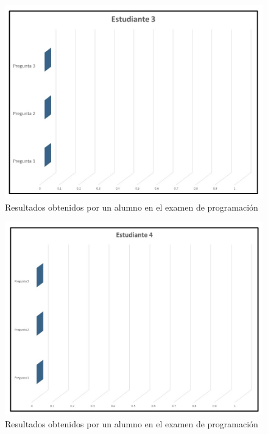 \documentclass[12pt] {report}
\begin{document}
\begin{figure}[H]
\centering 
\includegraphics[scale=.7]{PEstudiante3.JPG}
\caption{Resultados obtenidos por un alumno en el examen de programación}
\end{figure}

\begin{figure}[H]
\centering 
\includegraphics[scale=.7]{PEstudiante4.JPG}
\caption{Resultados obtenidos por un alumno en el examen de programación}
\end{figure}
\end{document}
